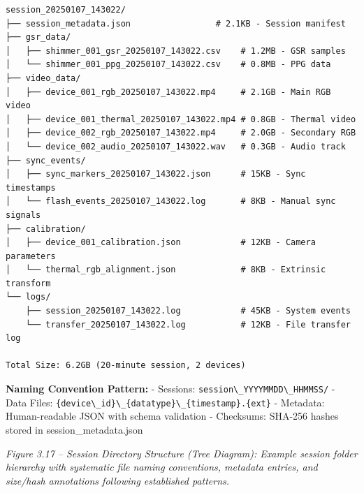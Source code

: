 \documentclass[12pt,a4paper]{article}
\begin{document}
\begin{lstlisting}
session_20250107_143022/
├── session_metadata.json                 # 2.1KB - Session manifest
├── gsr_data/
│   ├── shimmer_001_gsr_20250107_143022.csv    # 1.2MB - GSR samples
│   └── shimmer_001_ppg_20250107_143022.csv    # 0.8MB - PPG data
├── video_data/
│   ├── device_001_rgb_20250107_143022.mp4     # 2.1GB - Main RGB video  
│   ├── device_001_thermal_20250107_143022.mp4 # 0.8GB - Thermal video
│   ├── device_002_rgb_20250107_143022.mp4     # 2.0GB - Secondary RGB
│   └── device_002_audio_20250107_143022.wav   # 0.3GB - Audio track
├── sync_events/
│   ├── sync_markers_20250107_143022.json      # 15KB - Sync timestamps
│   └── flash_events_20250107_143022.log       # 8KB - Manual sync signals
├── calibration/
│   ├── device_001_calibration.json            # 12KB - Camera parameters
│   └── thermal_rgb_alignment.json             # 8KB - Extrinsic transform
└── logs/
    ├── session_20250107_143022.log            # 45KB - System events
    └── transfer_20250107_143022.log           # 12KB - File transfer log

Total Size: 6.2GB (20-minute session, 2 devices)
\end{lstlisting}

\textbf{Naming Convention Pattern:} - Sessions: \passthrough{\lstinline!session\_YYYYMMDD\_HHMMSS/!} - Data Files: \passthrough{\lstinline!\{device\_id\}\_\{datatype\}\_\{timestamp\}.\{ext\}!} - Metadata: Human-readable JSON with schema validation - Checksums: SHA-256 hashes stored in session\_metadata.json

\emph{Figure 3.17 -- Session Directory Structure (Tree Diagram): Example session folder hierarchy with systematic file naming conventions, metadata entries, and size/hash annotations following established patterns.}
\end{document}
